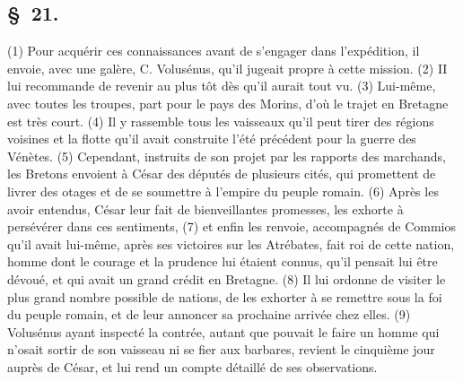 \documentclass[french,twoside]{book} %
\begin{document}
\subsection[{§ 21.}]{ \textsc{§ 21.} }
\noindent (1) Pour acquérir ces connaissances avant de s’engager dans l’expédition, il envoie, avec une galère, C. Volusénus, qu’il jugeait propre à cette mission. (2) II lui recommande de revenir au plus tôt dès qu’il aurait tout vu. (3) Lui-même, avec toutes les troupes, part pour le pays des Morins, d’où le trajet en Bretagne est très court. (4) Il y rassemble tous les vaisseaux qu’il peut tirer des régions voisines et la flotte qu’il avait construite l’été précédent pour la guerre des Vénètes. (5) Cependant, instruits de son projet par les rapports des marchands, les Bretons envoient à César des députés de plusieurs cités, qui promettent de livrer des otages et de se soumettre à l’empire du peuple romain. (6) Après les avoir entendus, César leur fait de bienveillantes promesses, les exhorte à persévérer dans ces sentiments, (7) et enfin les renvoie, accompagnés de Commios qu’il avait lui-même, après ses victoires sur les Atrébates, fait roi de cette nation, homme dont le courage et la prudence lui étaient connus, qu’il pensait lui être dévoué, et qui avait un grand crédit en Bretagne. (8) Il lui ordonne de visiter le plus grand nombre possible de nations, de les exhorter à se remettre sous la foi du peuple romain, et de leur annoncer sa prochaine arrivée chez elles. (9) Volusénus ayant inspecté la contrée, autant que pouvait le faire un homme qui n’osait sortir de son vaisseau ni se fier aux barbares, revient le cinquième jour auprès de César, et lui rend un compte détaillé de ses observations.
\end{document}
